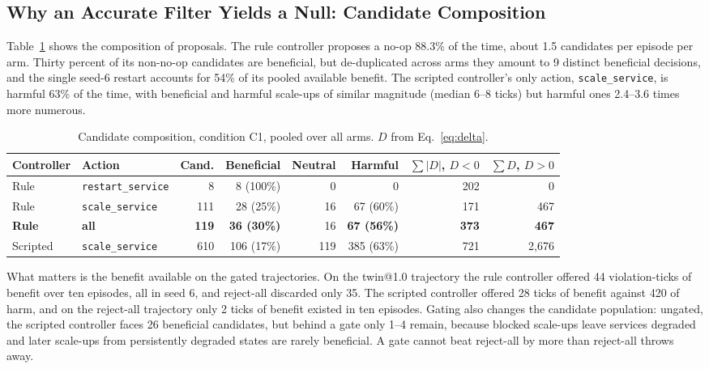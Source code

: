 \documentclass[conference]{IEEEtran}
\begin{document}
\subsection{Why an Accurate Filter Yields a Null: Candidate Composition}

Table~\ref{tab:composition} shows the composition of proposals. The rule controller proposes a no-op 88.3\% of the time, about 1.5 candidates per episode per arm. Thirty percent of its non-no-op candidates are beneficial, but de-duplicated across arms they amount to 9 distinct beneficial decisions, and the single seed-6 restart accounts for 54\% of its pooled available benefit. The scripted controller's only action, \texttt{scale\_service}, is harmful 63\% of the time, with beneficial and harmful scale-ups of similar magnitude (median 6--8 ticks) but harmful ones 2.4--3.6 times more numerous.

\begin{table}[t]
\centering
\caption{Candidate composition, condition C1, pooled over all arms. $D$ from Eq.~\eqref{eq:delta}.}
\label{tab:composition}
\small
\setlength{\tabcolsep}{4pt}
\begin{tabular}{@{}llrrrrrr@{}}
\toprule
Controller & Action & Cand. & Beneficial & Neutral & Harmful & $\sum |D|$, $D<0$ & $\sum D$, $D>0$ \\
\midrule
Rule & \texttt{restart\_service} & 8 & 8 (100\%) & 0 & 0 & 202 & 0 \\
Rule & \texttt{scale\_service} & 111 & 28 (25\%) & 16 & 67 (60\%) & 171 & 467 \\
\textbf{Rule} & \textbf{all} & \textbf{119} & \textbf{36 (30\%)} & 16 & \textbf{67 (56\%)} & \textbf{373} & \textbf{467} \\
Scripted & \texttt{scale\_service} & 610 & 106 (17\%) & 119 & 385 (63\%) & 721 & 2,676 \\
\bottomrule
\end{tabular}
\end{table}

What matters is the benefit available on the gated trajectories. On the twin@1.0 trajectory the rule controller offered 44 violation-ticks of benefit over ten episodes, all in seed 6, and reject-all discarded only 35. The scripted controller offered 28 ticks of benefit against 420 of harm, and on the reject-all trajectory only 2 ticks of benefit existed in ten episodes. Gating also changes the candidate population: ungated, the scripted controller faces 26 beneficial candidates, but behind a gate only 1--4 remain, because blocked scale-ups leave services degraded and later scale-ups from persistently degraded states are rarely beneficial. A gate cannot beat reject-all by more than reject-all throws away.
\end{document}
